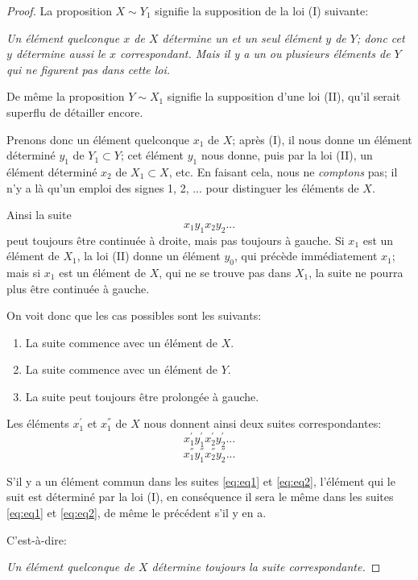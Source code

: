 \documentclass{article}
\begin{document}
\begin{proof}
La proposition \(X \sim Y_1\) signifie la supposition de la loi (I) suivante:

\textit{Un élément quelconque \(x\) de \(X\) détermine un et un seul élément \(y\) de \(Y\); donc cet \(y\) détermine aussi le \(x\) correspondant. Mais il y a un ou plusieurs éléments de \(Y\) qui ne figurent pas dans cette loi.}

De même la proposition \(Y \sim X_1\) signifie la supposition d'une loi (II), qu'il serait superflu de détailler encore.

Prenons donc un élément quelconque \(x_1\) de \(X\); après (I), il nous donne un élément déterminé \(y_1\) de \(Y_1 \subset Y\); cet élément \(y_1\) nous donne, puis par la loi (II), un élément déterminé \(x_2\) de \(X_1 \subset X\), etc. En faisant cela, nous ne \textit{comptons} pas; il n'y a là qu'un emploi des signes 1, 2, ... pour distinguer les éléments de \(X\).

Ainsi la suite
\[
x_{1}y_{1}x_{2}y_{2}...
\]
peut toujours être continuée à droite, mais pas toujours à gauche. Si \(x_1\) est un élément de \(X_1\), la loi (II) donne un élément \(y_0\), qui précède immédiatement \(x_1\); mais si \(x_1\) est un élément de \(X\), qui ne se trouve pas dans \(X_1\), la suite ne pourra plus être continuée à gauche.

On voit donc que les cas possibles sont les suivants:
\begin{enumerate}
    \item La suite commence avec un élément de \(X\).
    \item La suite commence avec un élément de \(Y\).
    \item La suite peut toujours être prolongée à gauche.
\end{enumerate}

Les éléments \(x_1^{'}\) et \(x_1^{''}\) de \(X\) nous donnent ainsi deux suites correspondantes:
\[
x_1^{'}y_1^{'}x_2^{'}y_2^{'}... \tag{1} \label{eq:eq1}
\]
\[
x_1^{''}y_1^{''}x_2^{''}y_2^{''}... \tag{2} \label{eq:eq2}
\]

S'il y a un élément commun dans les suites \eqref{eq:eq1} et \eqref{eq:eq2}, l'élément qui le suit est déterminé par la loi (I), en conséquence il sera le même dans les suites \eqref{eq:eq1} et \eqref{eq:eq2}, de même le précédent s'il y en a.

C'est-à-dire:

\textit{Un élément quelconque de \(X\) détermine toujours la suite correspondante.}


\end{proof}
\end{document}
